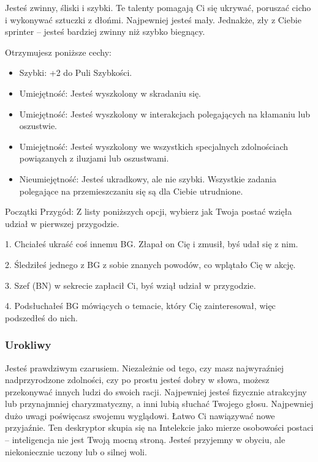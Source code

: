 Jesteś zwinny, śliski i szybki. Te talenty pomagają Ci się ukrywać, poruszać cicho i wykonywać sztuczki z dłońmi. Najpewniej jesteś mały. Jednakże, zły z Ciebie sprinter – jesteś bardziej zwinny niż szybko biegnący.

Otrzymujesz poniższe cechy:
\begin{itemize}
    \item  Szybki: +2 do Puli Szybkości.
    \item  Umiejętność: Jesteś wyszkolony w skradaniu się.
    \item  Umiejętność: Jesteś wyszkolony w interakcjach polegających na kłamaniu lub oszustwie.
    \item  Umiejętność: Jesteś wyszkolony we wszystkich specjalnych zdolnościach powiązanych z iluzjami lub oszustwami.
    \item  Nieumiejętność:  Jesteś ukradkowy, ale nie szybki. Wszystkie zadania polegające na przemieszczaniu się są dla Ciebie utrudnione. 
\end{itemize}

Początki Przygód: Z listy poniższych opcji, wybierz jak Twoja postać wzięła udział w pierwszej przygodzie.

1. Chciałeś ukraść coś innemu BG. Złapał on Cię i zmusił, byś udał się z nim.

2. Śledziłeś jednego z BG z sobie znanych powodów, co wplątało Cię w akcję.

3. Szef (BN) w sekrecie zapłacił Ci, byś wziął udział w przygodzie.

4. Podsłuchałeś BG mówiących o temacie, który Cię zainteresował, więc podszedłeś do nich.

\subsubsection{Urokliwy}

Jesteś prawdziwym czarusiem. Niezależnie od tego, czy masz najwyraźniej nadprzyrodzone zdolności, czy po prostu jesteś dobry w słowa, możesz przekonywać innych ludzi do swoich racji. Najpewniej jesteś fizycznie atrakcyjny lub przynajmniej charyzmatyczny, a inni lubią słuchać Twojego głosu. Najpewniej dużo uwagi poświęcasz swojemu wyglądowi. Łatwo Ci nawiązywać nowe przyjaźnie. Ten deskryptor skupia się na Intelekcie jako mierze osobowości postaci – inteligencja nie jest Twoją mocną stroną. Jesteś przyjemny w obyciu, ale niekoniecznie uczony lub o silnej woli. 

